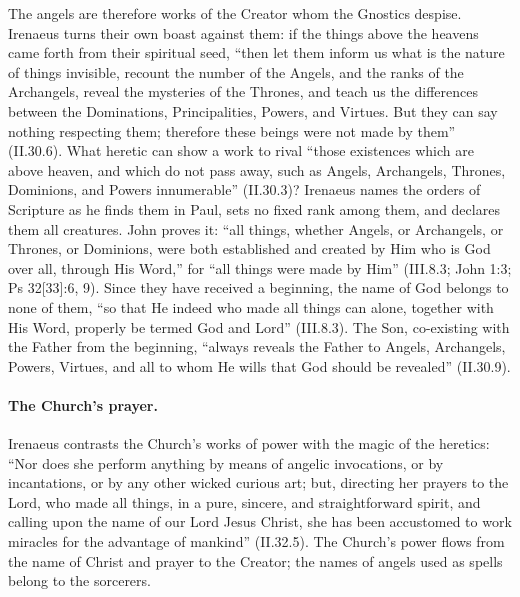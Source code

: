 The angels are therefore works of the Creator whom the Gnostics despise.
Irenaeus turns their own boast against them: if the things above the
heavens came forth from their spiritual seed, ``then let them inform us
what is the nature of things invisible, recount the number of the Angels,
and the ranks of the Archangels, reveal the mysteries of the Thrones, and
teach us the differences between the Dominations, Principalities, Powers,
and Virtues. But they can say nothing respecting them; therefore these
beings were not made by them'' (II.30.6). What heretic can show a work to rival
``those existences which are above heaven, and which do not pass away,
such as Angels, Archangels, Thrones, Dominions, and Powers innumerable''
(II.30.3)? Irenaeus names the orders of Scripture as he finds them in
Paul, sets no fixed rank among them, and declares them all creatures. John
proves it: ``all things, whether Angels, or Archangels, or Thrones, or
Dominions, were both established and created by Him who is God over all,
through His Word,'' for ``all things were made by Him'' (III.8.3; John
1:3; Ps 32[33]:6, 9). Since they have received a beginning, the name of
God belongs to none of them, ``so that He indeed who made all things can
alone, together with His Word, properly be termed God and Lord'' (III.8.3).
The Son, co-existing with the Father from the beginning, ``always reveals
the Father to Angels, Archangels, Powers, Virtues, and all to whom He wills
that God should be revealed'' (II.30.9).

\paragraph{The Church's prayer.} Irenaeus contrasts the Church's works of
power with the magic of the heretics: ``Nor does she perform anything by
means of angelic invocations, or by incantations, or by any other wicked
curious art; but, directing her prayers to the Lord, who made all things,
in a pure, sincere, and straightforward spirit, and calling upon the name
of our Lord Jesus Christ, she has been accustomed to work miracles for the
advantage of mankind'' (II.32.5). The Church's power flows from the name
of Christ and prayer to the Creator; the names of angels used as spells
belong to the sorcerers.

